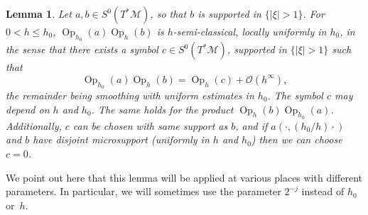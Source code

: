 \documentclass[10pt]{amsart}
\newtheorem{lemm}[theo]{Lemma}\newtheorem{prop}[theo]{Proposition}\newtheorem{coro}[theo]{Corollary}\newtheorem{conj}[theo]{Conjecture}
\theoremstyle{definition}\newtheorem{defi}[theo]{Definition}\newtheorem{rema}[theo]{Remark}\newtheorem{exam}[theo]{Example}\newtheorem{exem}[theo]{Example}\newtheorem{nota}[theo]{Notation}
\newcommand{\M}{\mathcal{M}}
\newcommand{\clO}{\mathcal{O}}
\DeclareMathOperator{\Op}{Op}
\begin{document}
\begin{lemm}\label{lemma:bound-composition}
Let $a, b \in S^0(T^*\M)$, so that $b$ is supported in $\{ |\xi|> 1\}$. For $0< h \leq h_0$, $\Op_{h_0}(a)\Op_h(b)$ is $h$-semi-classical, locally uniformly in $h_0$, in the sense that there exists a symbol $c \in S^0(T^*\M)$, supported in $\{ |\xi|>1\}$ such that
\begin{equation}\label{equation:bound-composition}
\Op_{h_0}(a)\Op_h(b) = \Op_h(c) + \clO(h^\infty),
\end{equation}
the remainder being smoothing with uniform estimates in $h_0$. The symbol $c$ may depend on $h$ and $h_0$. The same holds for the product $\Op_h(b)\Op_{h_0}(a)$. Additionally, $c$ can be chosen with same support as $b$, and if $a(\cdot, (h_0/h)\cdot)$ and $b$ have disjoint microsupport (uniformly in $h$ and $h_0$) then we can choose $c=0$.
\end{lemm}

We point out here that this lemma will be applied at various places with different parameters. In particular, we will sometimes use the parameter $2^{-j}$ instead of $h_0$ or~$h$.
\end{document}

